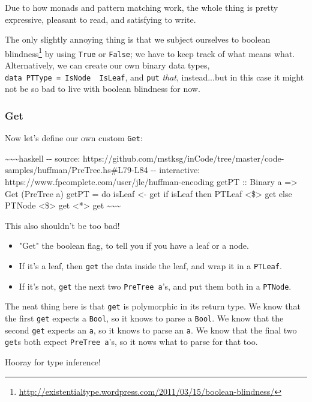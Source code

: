 \documentclass[]{article}
\renewcommand{\href}[2]{#2\footnote{\url{#1}}}
\begin{document}
Due to how monads and pattern matching work, the whole thing is pretty
expressive, pleasant to read, and satisfying to write.

The only slightly annoying thing is that we subject ourselves to
\href{http://existentialtype.wordpress.com/2011/03/15/boolean-blindness/}{boolean
blindness} by using \texttt{True} or \texttt{False}; we have to keep track of
what means what. Alternatively, we can create our own binary data types,
\texttt{data\ PTType\ =\ IsNode\ \textbar{}\ IsLeaf}, and \texttt{put}
\emph{that}, instead...but in this case it might not be so bad to live with
boolean blindness for now.

\subsubsection{Get}

Now let's define our own custom \texttt{Get}:

\textasciitilde{}\textasciitilde{}\textasciitilde{}haskell -\/- source:
https://github.com/mstksg/inCode/tree/master/code-samples/huffman/PreTree.hs\#L79-L84
-\/- interactive: https://www.fpcomplete.com/user/jle/huffman-encoding getPT ::
Binary a =\textgreater{} Get (PreTree a) getPT = do isLeaf \textless{}- get if
isLeaf then PTLeaf \textless{}\$\textgreater{} get else PTNode
\textless{}\$\textgreater{} get \textless{}*\textgreater{} get
\textasciitilde{}\textasciitilde{}\textasciitilde{}

This also shouldn't be too bad!

\begin{itemize}
\tightlist
\item
  "Get" the boolean flag, to tell you if you have a leaf or a node.
\item
  If it's a leaf, then \texttt{get} the data inside the leaf, and wrap it in a
  \texttt{PTLeaf}.
\item
  If it's not, \texttt{get} the next two \texttt{PreTree\ a}'s, and put them
  both in a \texttt{PTNode}.
\end{itemize}

The neat thing here is that \texttt{get} is polymorphic in its return type. We
know that the first \texttt{get} expects a \texttt{Bool}, so it knows to parse a
\texttt{Bool}. We know that the second \texttt{get} expects an \texttt{a}, so it
knows to parse an \texttt{a}. We know that the final two \texttt{get}s both
expect \texttt{PreTree\ a}'s, so it nows what to parse for that too.

Hooray for type inference!
\end{document}
